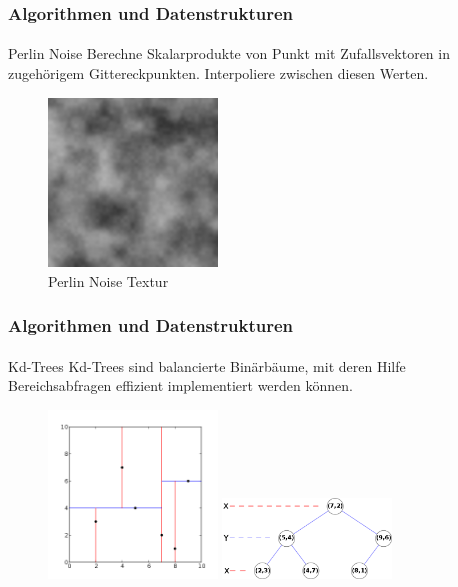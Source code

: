 \documentclass{beamer}
\begin{document}
\begin{frame}
    \frametitle{Algorithmen und Datenstrukturen}
\framesubtitle{}
\begin{block}{Perlin Noise}
Berechne Skalarprodukte von Punkt mit Zufallsvektoren in zugehörigem 
Gittereckpunkten. Interpoliere zwischen diesen Werten. 
\end{block}
\begin{figure}[H]
    \centering
    \includegraphics[width=0.4\textwidth]{images/perlin_noise.png}
    \caption{Perlin Noise Textur}
\end{figure}
\end{frame}


\begin{frame}
    \frametitle{Algorithmen und Datenstrukturen}
\framesubtitle{}
\begin{block}{Kd-Trees}
Kd-Trees sind balancierte Binärbäume, mit deren Hilfe Bereichsabfragen effizient
implementiert werden können.
\end{block}
\begin{figure}[H]
    \includegraphics[width=0.4\textwidth]{images/kdtree_2d.png}
    \includegraphics[width=0.4\textwidth]{images/kdtree.png}
\end{figure}
\end{frame}
\end{document}
